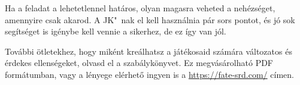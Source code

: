 Ha a feladat a lehetetlennel határos, olyan magasra veheted a nehézséget, amennyire csak akarod. A JK"~nak el kell használnia pár sors pontot, és jó sok segítséget is igénybe kell vennie a sikerhez, de ez így van jól.

További ötletekhez, hogy miként kreálhatsz a játékosaid számára változatos és érdekes ellenségeket, olvasd el a  szabálykönyvet. Ez megvásárolható PDF formátumban, vagy a lényege elérhető ingyen is a \url{https://fate-srd.com/} címen.
